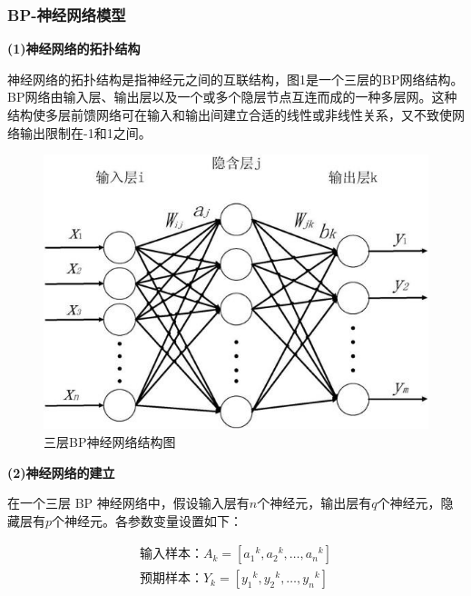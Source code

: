 \documentclass[UTF8]{ctexart}
\begin{document}
	\subsubsection{BP-神经网络模型}
	\textbf{(1)神经网络的拓扑结构}\par
	神经网络的拓扑结构是指神经元之间的互联结构，图1是一个三层的BP网络结构。BP网络由输入层、输出层以及一个或多个隐层节点互连而成的一种多层网。这种结构使多层前馈网络可在输入和输出间建立合适的线性或非线性关系，又不致使网络输出限制在-1和1之间。 \par
	\begin{figure}[h]
		\centering
		\includegraphics[scale=0.55]{三层BP神经网络结构图.jpeg}
		\caption{三层BP神经网络结构图}
	\end{figure}\par
	\textbf{(2)神经网络的建立}\par
	在一个三层 BP 神经网络中，假设输入层有$n$个神经元，输出层有$q$个神经元，隐藏层有$p$个神经元。各参数变量设置如下：\par 
	\begin{equation}
		\begin{aligned}
			\text{输入样本：}A_k=\left[ {a_1}^k,{a_2}^k,…,{a_n}^k \right] 
			\\
			\text{预期样本：}Y_k=\left[ {y_1}^k,{y_2}^k,…,{y_n}^k \right] 
		\end{aligned}
	\end{equation}
\end{document}
